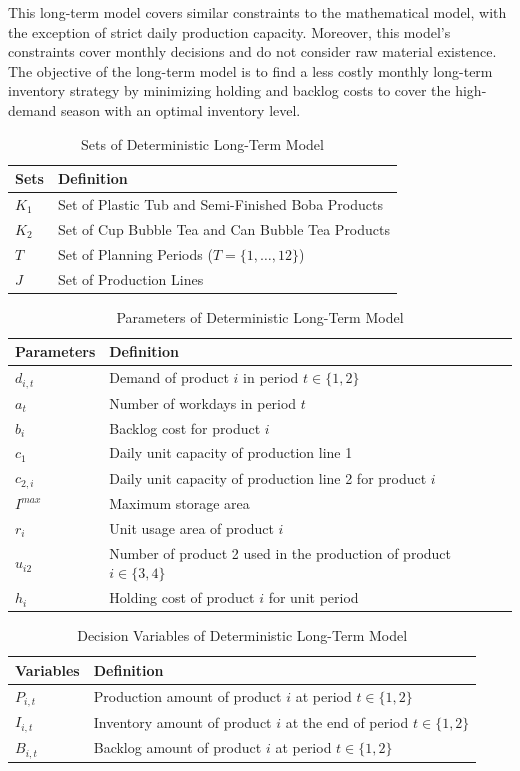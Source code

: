 \documentclass[11pt]{article}
\begin{document}
This long-term model covers similar constraints to the mathematical model, with the exception of strict daily production capacity. Moreover, this model’s constraints cover monthly decisions and do not consider raw material existence. The objective of the long-term model is to find a less costly monthly long-term inventory strategy by minimizing holding and backlog costs to cover the high-demand season with an optimal inventory level.

\begin{table}[h!]
\centering
\caption{Sets of Deterministic Long-Term Model}
\begin{tabular}{@{}lp{11cm}@{}}
\toprule
\textbf{Sets}& \textbf{Definition} \\
\midrule
$K_1$& Set of Plastic Tub and Semi-Finished Boba Products\\
$K_2$& Set of Cup Bubble Tea and Can Bubble Tea Products\\
$T$& Set of Planning Periods ($T=\{1,\dots,12\}$)\\
$J$& Set of Production Lines\\ \bottomrule
\end{tabular}
\end{table}

\begin{table}[h!]
\centering
\caption{Parameters of Deterministic Long-Term Model}
\begin{tabular}{@{}lp{11cm}@{}}
\toprule
\textbf{Parameters} & \textbf{Definition} \\
\midrule
$d_{i,t}$& Demand of product $i$ in period $t \in \{1,2\}$\\
$a_t$& Number of workdays in period $t$\\
$b_i$& Backlog cost for product $i$\\
$c_1$& Daily unit capacity of production line 1\\
$c_{2,i}$& Daily unit capacity of production line 2 for product $i$\\
$I^{max}$& Maximum storage area\\
$r_i$& Unit usage area of product $i$\\
$u_{i2}$& Number of product 2 used in the production of product $i\in \{3,4\}$\\
$h_i$& Holding cost of product $i$ for unit period\\
\bottomrule
\end{tabular}
\end{table}
\begin{table}[h!]
\centering
\caption{Decision Variables of Deterministic Long-Term Model}
\begin{tabular}{@{}lp{11cm}@{}}
\toprule
\textbf{Variables}& \textbf{Definition} \\
\midrule
$P_{i,t}$& Production amount of product $i$ at period $t \in \{1,2\}$ \\
$I_{i,t}$& Inventory amount of product $i$ at the end of period $t \in \{1,2\}$\\
$B_{i,t}$& Backlog amount of product $i$ at period $t \in \{1,2\}$\\ \bottomrule
\end{tabular}
\end{table}
\end{document}
